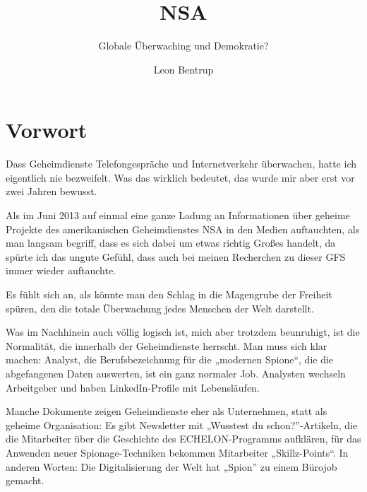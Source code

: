 \documentclass[12pt,a4paper]{scrartcl}
\author{Leon Bentrup}
\title{NSA}
\subtitle{Globale Überwaching und Demokratie?}
\begin{document}
\maketitle
\tableofcontents
\newpage
{}

\section{Vorwort}
Dass Geheimdienste Telefongespräche und Internetverkehr überwachen, hatte ich eigentlich nie bezweifelt. Was das wirklich bedeutet, das wurde mir aber erst vor zwei Jahren bewusst.

Als im Juni 2013 auf einmal eine ganze Ladung an Informationen über geheime Projekte des amerikanischen Geheimdienstes NSA in den Medien auftauchten, als man langsam begriff, dass es sich dabei um etwas richtig Großes handelt, da spürte ich das ungute Gefühl, dass auch bei meinen Recherchen zu dieser GFS immer wieder auftauchte.

Es fühlt sich an, als könnte man den Schlag in die Magengrube der Freiheit spüren, den die totale Überwachung jedes Menschen der Welt darstellt.

Was im Nachhinein auch völlig logisch ist, mich aber trotzdem beunruhigt, ist die Normalität, die innerhalb der Geheimdienste herrscht. Man muss sich klar machen: Analyst, die Berufsbezeichnung für die „modernen Spione“, die die abgefangenen Daten auswerten, ist ein ganz normaler Job. Analysten wechseln Arbeitgeber und haben LinkedIn-Profile mit Lebensläufen.

Manche Dokumente zeigen Geheimdienste eher als Unternehmen, statt als geheime Organisation: Es gibt Newsletter mit „Wusstest du schon?”-Artikeln, die die Mitarbeiter über die Geschichte des ECHELON-Programms aufklären, für das Anwenden neuer Spionage-Techniken bekommen Mitarbeiter „Skillz-Points“. In anderen Worten: Die Digitalisierung der Welt hat „Spion” zu einem Bürojob gemacht.
\end{document}
